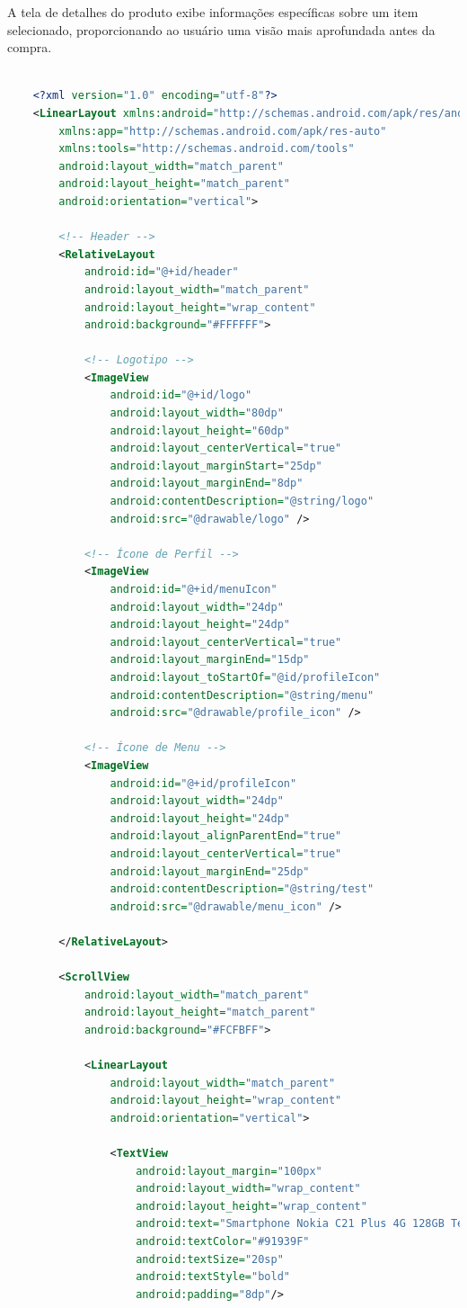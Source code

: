 \documentclass[
	12pt,				%
	openright,			%
	twoside,			%
	a4paper,			%
	english,			%
	brazil				%
	]{abntex2}
\begin{document}
A tela de detalhes do produto exibe informações específicas sobre um item selecionado, proporcionando ao usuário uma visão mais aprofundada antes da compra.

\begin{lstlisting}[language=XML, caption=Exemplo de Código XML, label=lst:xml]

	<?xml version="1.0" encoding="utf-8"?>
	<LinearLayout xmlns:android="http://schemas.android.com/apk/res/android"
		xmlns:app="http://schemas.android.com/apk/res-auto"
		xmlns:tools="http://schemas.android.com/tools"
		android:layout_width="match_parent"
		android:layout_height="match_parent"
		android:orientation="vertical">
	
		<!-- Header -->
		<RelativeLayout
			android:id="@+id/header"
			android:layout_width="match_parent"
			android:layout_height="wrap_content"
			android:background="#FFFFFF">
	
			<!-- Logotipo -->
			<ImageView
				android:id="@+id/logo"
				android:layout_width="80dp"
				android:layout_height="60dp"
				android:layout_centerVertical="true"
				android:layout_marginStart="25dp"
				android:layout_marginEnd="8dp"
				android:contentDescription="@string/logo"
				android:src="@drawable/logo" />
	
			<!-- Ícone de Perfil -->
			<ImageView
				android:id="@+id/menuIcon"
				android:layout_width="24dp"
				android:layout_height="24dp"
				android:layout_centerVertical="true"
				android:layout_marginEnd="15dp"
				android:layout_toStartOf="@id/profileIcon"
				android:contentDescription="@string/menu"
				android:src="@drawable/profile_icon" />
	
			<!-- Ícone de Menu -->
			<ImageView
				android:id="@+id/profileIcon"
				android:layout_width="24dp"
				android:layout_height="24dp"
				android:layout_alignParentEnd="true"
				android:layout_centerVertical="true"
				android:layout_marginEnd="25dp"
				android:contentDescription="@string/test"
				android:src="@drawable/menu_icon" />
	
		</RelativeLayout>
	
		<ScrollView
			android:layout_width="match_parent"
			android:layout_height="match_parent"
			android:background="#FCFBFF">
	
			<LinearLayout
				android:layout_width="match_parent"
				android:layout_height="wrap_content"
				android:orientation="vertical">
	
				<TextView
					android:layout_margin="100px"
					android:layout_width="wrap_content"
					android:layout_height="wrap_content"
					android:text="Smartphone Nokia C21 Plus 4G 128GB Tela HD+ 6,5 Câm Dupla 13MP Android Bateria de 2 dias de duração +"
					android:textColor="#91939F"
					android:textSize="20sp"
					android:textStyle="bold"
					android:padding="8dp"/>
	

\end{lstlisting}
\end{document}

